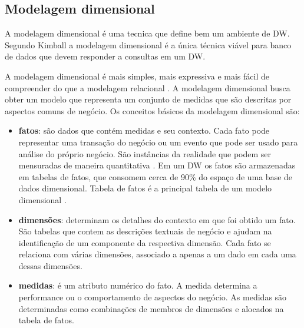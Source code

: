 \subsection{Modelagem dimensional}
\label{sec-dimensional-modeling}

A modelagem dimensional é uma tecnica que define bem um ambiente de DW. Segundo Kimball \citeyear{kimball2002} a modelagem dimensional é a única técnica viável para banco de dados  que devem responder a consultas em um DW.

A modelagem dimensional é mais simples, mais expressiva e mais fácil de compreender do que a modelagem relacional \cite{ballard1998}. A modelagem dimensional busca obter um modelo que representa um conjunto de medidas que são descritas por aspectos comuns de negócio.
%
Os conceitos básicos da modelagem dimensional são:

\begin{itemize}
	\item \textbf{fatos}: são dados que contém medidas e seu contexto. Cada fato pode representar uma transação do negócio ou um evento que pode ser usado para análise do próprio negócio. São instâncias da realidade  que podem ser mensuradas de maneira quantitativa \cite{kimball2002}. Em um DW os fatos são armazenadas em tabelas de fatos, que consomem cerca de 90\% do espaço de uma base de dados dimensional. Tabela de fatos é a principal tabela de um modelo dimensional \cite{kimball2002,ballard1998}.

	\item \textbf{dimensões}: determinam os detalhes do contexto em que foi obtido um fato. São tabelas que contem as descrições textuais de negócio e ajudam na identificação de um componente da respectiva dimensão. Cada fato se relaciona com várias dimensões, associado a apenas a um dado em cada uma dessas dimensões.

	\item \textbf{medidas}: é um atributo numérico do fato. A medida determina a performance ou o comportamento de aspectos do negócio. As medidas são determinadas como combinações de membros de dimensões e alocados na tabela de fatos.
\end{itemize}


